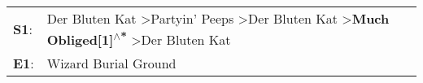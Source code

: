 \begin{supertabular}{p{0.03\textwidth}p{0.92\textwidth}}
 \textbf{S1}:  &  Der Bluten Kat\textsuperscript{} \textgreater \enspace Partyin' Peeps\textsuperscript{} \textgreater \enspace Der Bluten Kat\textsuperscript{} \textgreater \enspace \textbf{Much Obliged[1]\textsuperscript{$\wedge$*}} \textgreater \enspace Der Bluten Kat\textsuperscript{}  \enspace  \\
 \textbf{E1}:  &                                                                                                                                                                                                                                           Wizard Burial Ground\textsuperscript{}  \enspace  \\
\end{supertabular}
